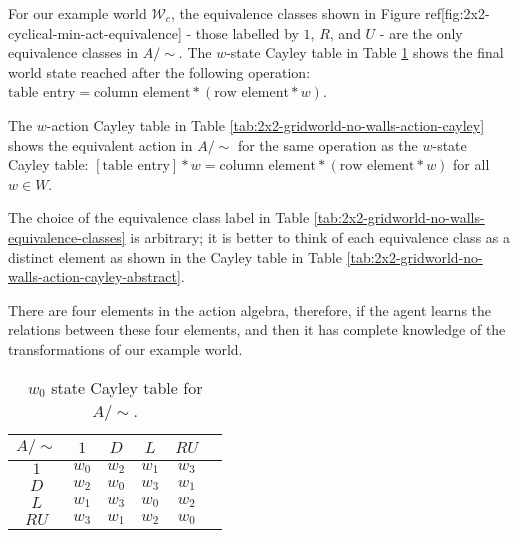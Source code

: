 For our example world $\mathscr{W}_{c}$, the equivalence classes shown in Figure ref[fig:2x2-cyclical-min-act-equivalence] - those labelled by $1$, $R$, and $U$ - are the only equivalence classes in $A/\sim$.
The $w$-state Cayley table in Table \ref{tab:2x2-gridworld-no-walls-state-cayley} shows the final world state reached after the following operation: $\text{table entry} = \text{column element} * (\text{row element} * w)$.

The $w$-action Cayley table in Table \ref{tab:2x2-gridworld-no-walls-action-cayley} shows the equivalent action in $A/\sim$ for the same operation as the $w$-state Cayley table: $[\text{table entry}] * w = \text{column element} * (\text{row element} * w)$ for all $w \in W$.

The choice of the equivalence class label in Table \ref{tab:2x2-gridworld-no-walls-equivalence-classes} is arbitrary; it is better to think of each equivalence class as a distinct element as shown in the Cayley table in Table \ref{tab:2x2-gridworld-no-walls-action-cayley-abstract}.

There are four elements in the action algebra, therefore, if the agent learns the relations between these four elements, and then it has complete knowledge of the transformations of our example world.



\begin{table}
    \centering
    \begin{tabular}{c|c c c c c}
        $A/\sim$    &  $1$      & $D$       & $L$       & $RU$\\
         \hline
        $1$         & $w_{0}$   & $w_{2}$   & $w_{1}$   & $w_{3}$\\
        $D$         & $w_{2}$   & $w_{0}$   & $w_{3}$   & $w_{1}$\\
        $L$         & $w_{1}$   & $w_{3}$   & $w_{0}$   & $w_{2}$\\
        $RU$        & $w_{3}$   & $w_{1}$   & $w_{2}$   & $w_{0}$\\
    \end{tabular}
    \caption{$w_{0}$ state Cayley table for $A/\sim$.}
    \label{tab:2x2-gridworld-no-walls-state-cayley}
\end{table}

